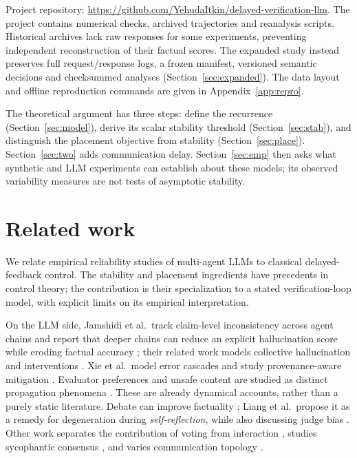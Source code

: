 \documentclass[11pt]{article}
\theoremstyle{definition}
\begin{document}
Project repository: \url{https://github.com/YehudaItkin/delayed-verification-llm}.
The project contains numerical checks, archived trajectories and reanalysis scripts. Historical
archives lack raw responses for some experiments, preventing independent reconstruction of their
factual scores. The expanded study instead preserves full request/response logs, a frozen manifest,
versioned semantic decisions and checksummed analyses (Section~\ref{sec:expanded}).
The data layout and offline reproduction commands are given in Appendix~\ref{app:repro}.

The theoretical argument has three steps: define the recurrence (Section~\ref{sec:model}),
derive its scalar stability threshold (Section~\ref{sec:stab}), and distinguish the placement
objective from stability (Section~\ref{sec:place}). Section~\ref{sec:two} adds communication
delay. Section~\ref{sec:emp} then asks what synthetic and LLM experiments can establish about
these models; its observed variability measures are not tests of asymptotic stability.

\section{Related work}\label{sec:related}

We relate empirical reliability studies of multi-agent LLMs to classical delayed-feedback control.
The stability and placement ingredients have precedents in control theory; the contribution is their
specialization to a stated verification-loop model, with explicit limits on its empirical interpretation.

On the LLM side, Jamshidi et al.\ track claim-level inconsistency across agent chains and report
that deeper chains can reduce an explicit hallucination score while eroding factual accuracy
\cite{HallCascade}; their related work models collective hallucination and interventions
\cite{Collective}. Xie et al.\ model error cascades and study provenance-aware mitigation
\cite{SparkFire}. Evaluator preferences and unsafe content are studied as distinct propagation
phenomena \cite{Contagion,PropGuard}. These are already dynamical accounts, rather than a purely
static literature. Debate can improve factuality \cite{Du,ReConcile}; Liang et al.\ propose it as a
remedy for degeneration during \emph{self-reflection}, while also discussing judge bias \cite{Liang}.
Other work separates the contribution of voting from interaction \cite{DebateVote}, studies
sycophantic consensus \cite{TalkCheap}, and varies communication topology \cite{SparseTopo}.
\end{document}
